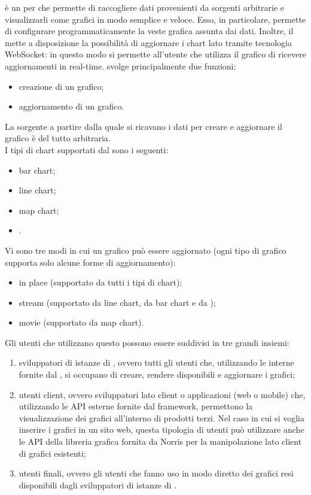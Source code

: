 		 è un  per  che permette di raccogliere dati provenienti da sorgenti arbitrarie e visualizzarli come grafici in modo semplice e veloce. Esso, in particolare, permette di configurare programmaticamente la veste grafica assunta dai dati. Inoltre, il  mette a disposizione la possibilità di aggiornare i chart lato  tramite tecnologia WebSocket: in questo modo si permette all'utente che utilizza il grafico di ricevere aggiornamenti in real-time.
		 svolge principalmente due funzioni:
		\begin{itemize}
			\item creazione di un grafico;
			\item aggiornamento di un grafico.
		\end{itemize}
		La sorgente a partire dalla quale si ricavano i dati per creare e aggiornare il grafico è del tutto arbitraria.\\
		I tipi di chart supportati dal  sono i seguenti:
		\begin{itemize}
			\item bar chart;
			\item line chart;
			\item map chart;
			\item {}.
		\end{itemize}
		Vi sono tre modi in cui un grafico può essere aggiornato (ogni tipo di grafico supporta solo alcune forme di aggiornamento):
		\begin{itemize}
			\item in place (supportato da tutti i tipi di chart);
			\item stream (supportato da line chart, da bar chart e da );
			\item movie (supportato da map chart).
		\end{itemize}
		Gli utenti che utilizzano questo  possono essere suddivisi in tre grandi insiemi:
		\begin{enumerate}
			\item sviluppatori di istanze di , ovvero tutti gli utenti che, utilizzando le  interne fornite dal , si occupano di creare, rendere disponibili e aggiornare i grafici;
			\item utenti client, ovvero sviluppatori lato client o applicazioni (web o mobile) che, utilizzando le API esterne fornite dal framework, permettono la visualizzazione dei grafici all'interno di prodotti terzi. Nel caso in cui si voglia inserire i grafici in un sito web, questa tipologia di utenti può utilizzare anche le API della libreria grafica fornita da Norris per la manipolazione lato client di grafici esistenti;
			\item utenti finali, ovvero gli utenti che fanno uso in modo diretto dei grafici resi disponibili dagli sviluppatori di istanze di .
		\end{enumerate}
